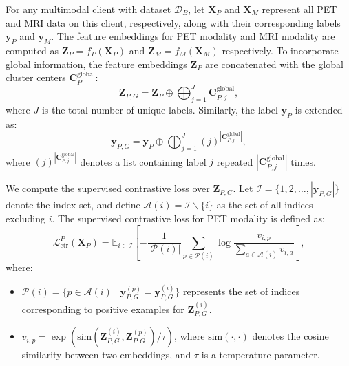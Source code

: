 For any multimodal client with dataset $\mathcal{D}_B$, let \( \mathbf{X}_P \) and \( \mathbf{X}_M \) represent all PET and MRI data on this client, respectively, along with their corresponding labels \( \mathbf{y}_P \) and \( \mathbf{y}_M \). The feature embeddings for PET modality and MRI modality are computed as \( \mathbf{Z}_P = f_P(\mathbf{X}_P) \) and  \( \mathbf{Z}_M = f_M(\mathbf{X}_M) \) respectively. To incorporate global information, the feature embeddings \( \mathbf{Z}_P \) are concatenated with the global cluster centers \( \mathbf{C}_{P}^{\text{global}} \):
\begin{equation}
    \mathbf{Z}_{P,G} = \mathbf{Z}_P \oplus \bigoplus_{j=1}^J \mathbf{C}_{P,j}^{\text{global}},
\end{equation}
where \( J \) is the total number of unique labels. Similarly, the label \( \mathbf{y}_P \) is extended as:
\begin{equation}
    \mathbf{y}_{P,G} = \mathbf{y}_P \oplus \bigoplus_{j=1}^J (j )^{|\mathbf{C}_{P,j}^{\text{global}}|},
\end{equation}
where \( ( j )^{|\mathbf{C}_{P,j}^{\text{global}}|} \) denotes a list containing label \( j \) repeated \( |\mathbf{C}_{P,j}^{\text{global}}| \) times.

We compute the supervised contrastive loss over \( \mathbf{Z}_{P,G} \). Let \( \mathcal{I} = \{ 1, 2, \dots, |\mathbf{y}_{P,G}| \} \) denote the index set, and define \( \mathcal{A}(i) = \mathcal{I} \backslash \{ i \} \) as the set of all indices excluding \( i \). The supervised contrastive loss for PET modality is defined as:
\begin{equation}
    \mathcal{L}_{\text{ctr}}^P(\mathbf{X}_P) = \mathbb{E}_{i \in \mathcal{I}} \left[ -\frac{1}{|\mathcal{P}(i)|} \sum_{p \in \mathcal{P}(i)} \log \frac{v_{i,p}}{\sum_{a \in \mathcal{A}(i)} v_{i,a}} \right],
\end{equation}
where:
\begin{itemize}
    \item \( \mathcal{P}(i) = \{ p \in \mathcal{A}(i) \mid \mathbf{y}_{P,G}^{(p)} = \mathbf{y}_{P,G}^{(i)} \} \) represents the set of indices corresponding to positive examples for \( \mathbf{Z}_{P,G}^{(i)} \).
    \item \( v_{i,p} = \exp(\text{sim}(\mathbf{Z}_{P,G}^{(i)}, \mathbf{Z}_{P,G}^{(p)}) / \tau) \), where \( \text{sim}(\cdot, \cdot) \) denotes the cosine similarity between two embeddings, and \( \tau \) is a temperature parameter.
\end{itemize}

